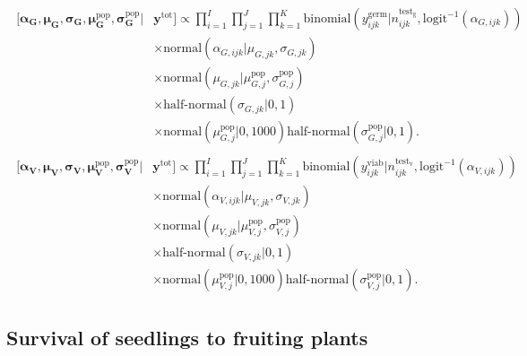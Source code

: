 \documentclass[12pt, oneside, titlepage]{article}   	%
\begin{document}

\begin{align}
  \begin{split}
 [  \bm{\alpha_G} , \bm{\mu_G} , \bm{\sigma_G} , \bm{\mu^\mathrm{pop}_G}, \bm{\sigma^\mathrm{pop}_G} | & \bm{y^{\mathrm{tot}}}  ] \propto \prod_{i=1}^{I}   \prod_{j=1}^{J}  \prod_{k=1}^{K} 
   \mathrm{binomial} ( y^{\mathrm{germ}}_{ijk} | n^\mathrm{test_g}_{ijk}, \mathrm{logit}^{-1}( \alpha_{G,ijk} ) ) 
   \\ & \times \mathrm{normal} ( \alpha_{G,ijk}  | \mu_{G,jk}, \sigma{_{G,jk} })
  \\ & \times \mathrm{normal} ( \mu_{G,jk}  | \mu^\mathrm{pop}_{G,j}, \sigma^\mathrm{pop}_{G,j} )
  \\ & \times \textrm{half-normal} ( \sigma_{G,jk} | 0,1)
  \\ & \times \mathrm{normal} ( \mu^\mathrm{pop}_{G,j} | 0 , 1000 ) \textrm{half-normal} ( \sigma^\mathrm{pop}_{G,j} | 0,1).
  \end{split}
\end{align}
%
\begin{align}
  \begin{split}
 [  \bm{\alpha_V} , \bm{\mu_V} , \bm{\sigma_V} , \bm{\mu^\mathrm{pop}_V}, \bm{\sigma^\mathrm{pop}_V} | & \bm{y^{\mathrm{tot}}}  ] \propto \prod_{i=1}^{I}   \prod_{j=1}^{J}  \prod_{k=1}^{K} 
   \mathrm{binomial} ( y^{\mathrm{viab}}_{ijk} | n^\mathrm{test_v}_{ijk}, \mathrm{logit}^{-1}( \alpha_{V,ijk} ) ) 
   \\ & \times \mathrm{normal} ( \alpha_{V,ijk}  | \mu_{V,jk}, \sigma{_{V,jk} })
  \\ & \times \mathrm{normal} ( \mu_{V,jk}  | \mu^\mathrm{pop}_{V,j}, \sigma^\mathrm{pop}_{V,j} )
  \\ & \times \textrm{half-normal} ( \sigma_{V,jk} | 0,1)
  \\ & \times \mathrm{normal} ( \mu^\mathrm{pop}_{V,j} | 0 , 1000 ) \textrm{half-normal} ( \sigma^\mathrm{pop}_{V,j} | 0,1).
  \end{split}
\end{align}
%

\clearpage
\newpage

\subsection*{Survival of seedlings to fruiting plants}
\end{document}
